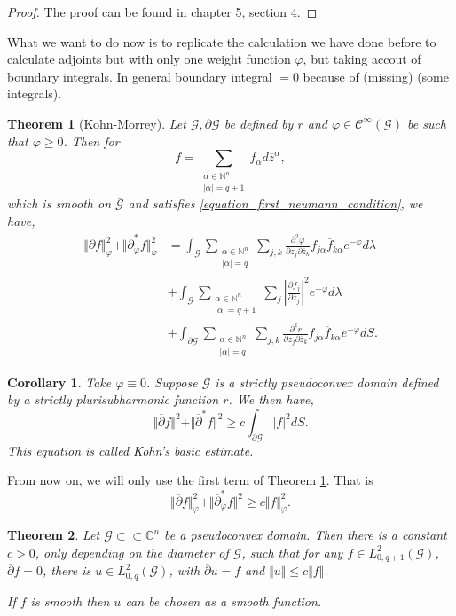 \documentclass{article}
\newtheorem{theorem}{Theorem} [section]
\newtheorem{corollary}{Corollary} [section]
\newcommand{\norm}[1]{\Vert #1 \Vert}
\newcommand{\N}[0]{\mathbb{N}}
\newcommand{\C}[0]{\mathbb{C}}
\newcommand{\G}[0]{\mathcal{G}}
\newcommand{\pd}[2]{{\frac {\partial#1} {\partial#2}}}
\newcommand{\bd}[0]{\partial}
\newcommand{\cbd}[0]{\overline{\partial}}
\newcommand{\compembed}[0]{\subset\subset}
\newcommand{\ck}[1]{\mathcal{C}^{#1}}
\newcommand{\cinf}[0]{\ck{\infty}}
\begin{document}
  \begin{proof}
    The proof can be found in \cite{LiM} chapter 5, section 4.
  \end{proof}
  What we want to do now is to replicate the calculation we have done before to calculate adjoints but with only one weight function $\varphi$, but taking accout of boundary integrals. In general boundary integral $=0$ because of (missing) (some integrals).
  \begin{theorem}[Kohn-Morrey]
    Let $\G,\bd\G$ be defined by $r$ and $\varphi\in\cinf(\G)$ be such that $\varphi\geq0$. Then for 
    \begin{equation*}
    f=\sum_{\substack{\alpha\in\N^n\\\vert\alpha\vert=q+1}}f_\alpha d\overline{z}^\alpha,
    \end{equation*}
    which is smooth on $\overline{\G}$ and satisfies \eqref{equation_first_neumann_condition}, we have,
    \begin{align*}
      \norm{\cbd f}^2_\varphi+\norm{\cbd_\varphi^*f}^2_\varphi&=\int_\G\sum_{\substack{\alpha\in\N^n\\\vert\alpha\vert=q}}\sum_{j,k}{\frac {\partial^2\varphi}{\partial z_j\partial\overline{z}_k}}f_{j\alpha}\overline{f}_{k\alpha}e^{-\varphi}d\lambda\\
      &+\int_\G\sum_{\substack{\alpha\in\N^n\\\vert\alpha\vert=q+1}}\sum_j\left\vert\pd{f_j}{\overline{z}_j}\right\vert^2e^{-\varphi}d\lambda\\
      &+\int_{\bd\G}\sum_{\substack{\alpha\in\N^n\\\vert\alpha\vert=q}}\sum_{j,k}{\frac {\partial^2 r}{\partial z_j\bd \overline{z}_k}}f_{j\alpha}\overline{f}_{k\alpha}e^{-\varphi}dS.
    \end{align*}
    \label{theorem_kohn_morrey}
  \end{theorem}
  \begin{corollary}
    Take $\varphi\equiv0$. Suppose $\G$ is a strictly pseudoconvex domain defined by a strictly plurisubharmonic function $r$. We then have,
    \begin{equation*}
      \norm{\cbd f}^2+\norm{\cbd^* f}^2\geq c\int_{\bd\G}\vert f\vert^2 dS.
    \end{equation*}
    This equation is called Kohn's basic estimate.
  \end{corollary}
  From now on, we will only use the first term of Theorem \ref{theorem_kohn_morrey}. That is 
  \begin{equation*}
      \norm{\cbd f}_\varphi^2+\norm{\cbd_\varphi^* f}^2\geq c\norm{f}_\varphi^2.
    \end{equation*}
    \begin{theorem}
      Let $\G\compembed\C^n$ be a pseudoconvex domain. Then there is a constant $c>0$, only depending on the diameter of $\G$, such that for any $f\in L^2_{0,q+1}(\G)$, $\cbd f=0$, there is $u\in L_{0,q}^2(\G)$, with $\cbd u=f$ and $\norm{u}\leq c\norm{f}$.
      \par If $f$ is smooth then $u$ can be chosen as a smooth function.
    \end{theorem}
\end{document}
